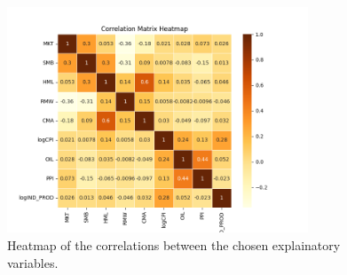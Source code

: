 
\begin{figure}[h]
    \centering
    \includegraphics[width=0.8\textwidth]{images/Correlation_heatmap.png}
    \caption{Heatmap of the correlations between the chosen explainatory variables.}\label{fig:Correlation_heatmap}
\end{figure}